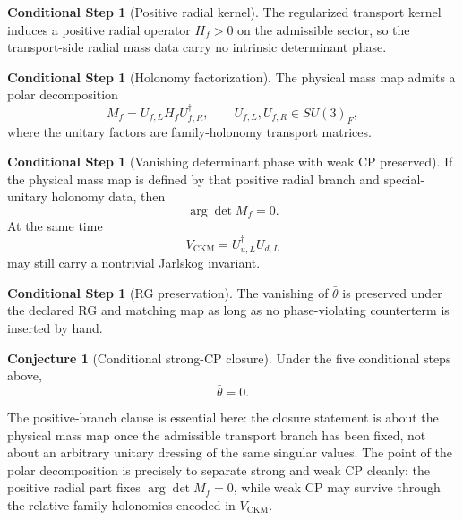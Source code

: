 \documentclass[11pt,a4paper]{article}
\theoremstyle{definition}
\newtheorem{conjecture}[theorem]{Conjecture}
\newtheorem{conditionalstep}[theorem]{Conditional Step}
\theoremstyle{remark}
\begin{document}
\begin{conditionalstep}[Positive radial kernel]
The regularized transport kernel induces a positive radial operator $H_f>0$ on the admissible sector, so the transport-side radial mass data carry no intrinsic determinant phase.
\end{conditionalstep}

\begin{conditionalstep}[Holonomy factorization]
The physical mass map admits a polar decomposition
\[
M_f=U_{f,L}H_fU_{f,R}^\dagger,
\qquad
U_{f,L},U_{f,R}\in SU(3)_F,
\]
where the unitary factors are family-holonomy transport matrices.
\end{conditionalstep}

\begin{conditionalstep}[Vanishing determinant phase with weak CP preserved]
If the physical mass map is defined by that positive radial branch and special-unitary holonomy data, then
\[
\arg\det M_f=0.
\]
At the same time
\[
V_{\mathrm{CKM}}=U_{u,L}^\dagger U_{d,L}
\]
may still carry a nontrivial Jarlskog invariant.
\end{conditionalstep}

\begin{conditionalstep}[RG preservation]
The vanishing of $\bar\theta$ is preserved under the declared RG and matching map as long as no phase-violating counterterm is inserted by hand.
\end{conditionalstep}

\begin{conjecture}[Conditional strong-CP closure]
Under the five conditional steps above,
\[
\bar\theta=0.
\]
\end{conjecture}

The positive-branch clause is essential here: the closure statement is about the physical mass map once the admissible transport branch has been fixed, not about an arbitrary unitary dressing of the same singular values. The point of the polar decomposition is precisely to separate strong and weak CP cleanly: the positive radial part fixes $\arg\det M_f=0$, while weak CP may survive through the relative family holonomies encoded in $V_{\mathrm{CKM}}$.
\end{document}
